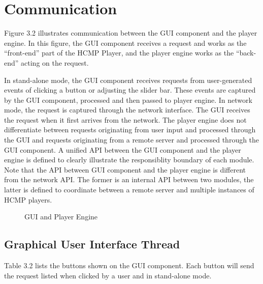 \section{Communication}

Figure 3.2 illustrates communication between the GUI component and the player 
engine. In this figure, the GUI component receives a request and works as the 
``front-end'' part of the HCMP Player, and the player engine works as the 
``back-end'' acting on the request. 

In stand-alone mode, the GUI component 
receives requests from user-generated events of clicking a button or adjusting 
the slider bar. These events are captured by the GUI component, processed and 
then passed to player engine. In network mode, the request is captured through 
the network interface. The GUI receives the request when it first arrives 
from the network. The player engine does not differentiate between requests 
originating from user input and processed through the GUI and requests 
originating from a remote server and processed through the GUI component. 
A unified API between the GUI component and the player engine is defined to
clearly illustrate the responsiblity boundary of each module. Note that the 
API between GUI component and the player engine is different from the network API. 
The former is an internal API between two modules, the latter is defined to 
coordinate between a remote server and multiple instances of HCMP players.

\begin{figure}[H]
\caption{GUI and Player Engine}
\label{fig:speciation}
\end{figure}

\subsection{Graphical User Interface Thread}

Table 3.2 lists the buttons shown on the GUI component. Each button will send
the request listed when clicked by a user and in stand-alone mode.

